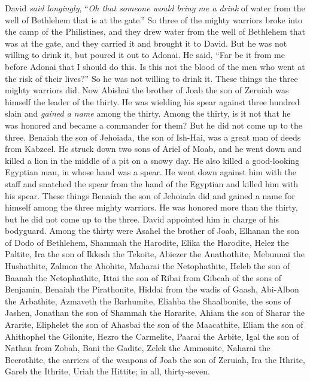 \begin{biblechapter}
\verse David \textit{said longingly}, “\textit{Oh that someone would bring me a drink} of water from the well of Bethlehem that is at the gate.”
\verse So three of the mighty warriors broke into the camp of the Philistines, and they drew water from the well of Bethlehem that was at the gate, and they carried it and brought it to David. But he was not willing to drink it, but poured it out to Adonai.
\verse He said, “Far be it from me before Adonai that I should do this. Is this not the blood of the men who went at the risk of their lives?” So he was not willing to drink it. These things the three mighty warriors did.
\verse Now Abishai the brother of Joab the son of Zeruiah was himself the leader of the thirty. He was wielding his spear against three hundred slain and \textit{gained a name} among the thirty.
\verse Among the thirty, is it not that he was honored and became a commander for them? But he did not come up to the three.
\verse Benaiah the son of Jehoiada, the son of Ish-Hai, was a great man of deeds from Kabzeel. He struck down two sons of Ariel of Moab, and he went down and killed a lion in the middle of a pit on a snowy day.
\verse He also killed a good-looking Egyptian man, in whose hand was a spear. He went down against him with the staff and snatched the spear from the hand of the Egyptian and killed him with his spear.
\verse These things Benaiah the son of Jehoiada did and gained a name for himself among the three mighty warriors.
\verse He was honored more than the thirty, but he did not come up to the three. David appointed him in charge of his bodyguard.
 Among the thirty were Asahel the brother of Joab, Elhanan the son of Dodo of Bethlehem,
\verse Shammah the Harodite, Elika the Harodite,
\verse Helez the Paltite, Ira the son of Ikkesh the Tekoite,
\verse Abiezer the Anathothite, Mebunnai the Hushathite,
\verse Zalmon the Ahohite, Maharai the Netophathite,
\verse Heleb the son of Baanah the Netophathite, Ittai the son of Ribai from Gibeah of the sons of Benjamin,
\verse Benaiah the Pirathonite, Hiddai from the wadis of Gaash,
\verse Abi-Albon the Arbathite, Azmaveth the Barhumite,
\verse Eliahba the Shaalbonite, the sons of Jashen, Jonathan
\verse the son of Shammah the Hararite, Ahiam the son of Sharar the Ararite,
\verse Eliphelet the son of Ahasbai the son of the Maacathite, Eliam the son of Ahithophel the Gilonite,
\verse Hezro the Carmelite, Paarai the Arbite,
\verse Igal the son of Nathan from Zobah, Bani the Gadite,
\verse Zelek the Ammonite, Naharai the Beerothite, the carriers of the weapons of Joab the son of Zeruiah,
\verse Ira the Ithrite, Gareb the Ithrite,
\verse Uriah the Hittite; in all, thirty-seven.
\end{biblechapter}

